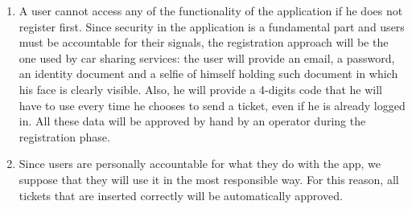 \begin{enumerate}
    \item A user cannot access any of the functionality of the application if he does not register first.
        Since security in the application is a fundamental part and users must be accountable for their signals,
        the registration approach will be the one used by car sharing services: the user will provide an email, 
        a password, an identity document and a selfie of himself holding such document in which his face is clearly visible.
        Also, he will provide a 4-digits code that he will have to use every time he chooses to send a ticket, even if
        he is already logged in. All these data will be approved by hand by an operator during the registration phase.
    \item Since users are personally accountable for what they do with the app, we suppose that they will use it
        in the most responsible way. For this reason, all tickets that are inserted correctly will be automatically approved.
\end{enumerate}